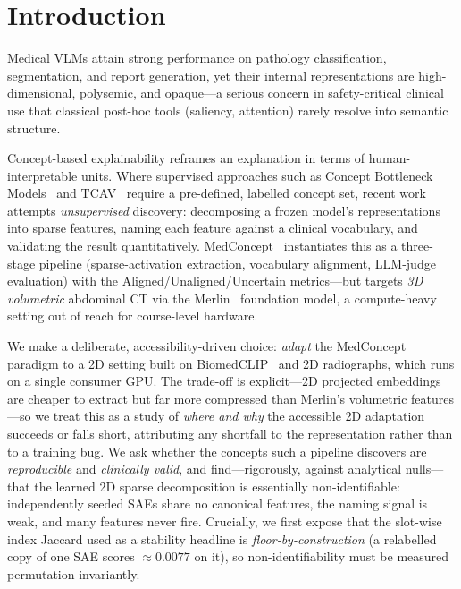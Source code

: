 \documentclass[sigconf, nonacm]{acmart}
\begin{document}
\maketitle

\section{Introduction}
Medical VLMs attain strong performance on pathology classification, segmentation, and report generation, yet their internal representations are high-dimensional, polysemic, and opaque---a serious concern in safety-critical clinical use that classical post-hoc tools (saliency, attention) rarely resolve into semantic structure.

Concept-based explainability reframes an explanation in terms of human-interpretable units. Where supervised approaches such as Concept Bottleneck Models~\cite{koh2020concept} and TCAV~\cite{kim2018tcav} require a pre-defined, labelled concept set, recent work attempts \emph{unsupervised} discovery: decomposing a frozen model's representations into sparse features, naming each feature against a clinical vocabulary, and validating the result quantitatively. MedConcept~\cite{haque2026medconcept} instantiates this as a three-stage pipeline (sparse-activation extraction, vocabulary alignment, LLM-judge evaluation) with the Aligned/Unaligned/Uncertain metrics---but targets \emph{3D volumetric} abdominal CT via the Merlin~\cite{blankemeier2024merlin} foundation model, a compute-heavy setting out of reach for course-level hardware.

We make a deliberate, accessibility-driven choice: \emph{adapt} the MedConcept paradigm to a 2D setting built on BiomedCLIP~\cite{zhang2023biomedclip} and 2D radiographs, which runs on a single consumer GPU. The trade-off is explicit---2D projected embeddings are cheaper to extract but far more compressed than Merlin's volumetric features---so we treat this as a study of \emph{where and why} the accessible 2D adaptation succeeds or falls short, attributing any shortfall to the representation rather than to a training bug. We ask whether the concepts such a pipeline discovers are \emph{reproducible} and \emph{clinically valid}, and find---rigorously, against analytical nulls---that the learned 2D sparse decomposition is essentially non-identifiable: independently seeded SAEs share no canonical features, the naming signal is weak, and many features never fire. Crucially, we first expose that the slot-wise index Jaccard used as a stability headline is \emph{floor-by-construction} (a relabelled copy of one SAE scores ${\approx}0.0077$ on it), so non-identifiability must be measured permutation-invariantly.
\end{document}
